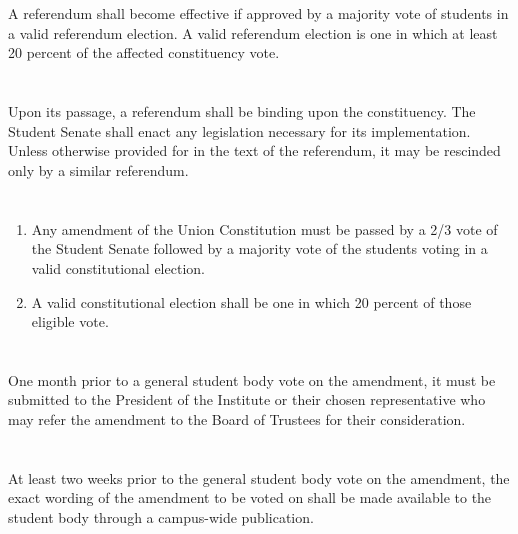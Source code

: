 \documentclass{uniondoc}
\begin{document}
\section{}

A referendum shall become effective if approved by a majority vote of students in a valid referendum election. A valid referendum election is one in which at least 20 percent of the affected constituency vote.

\section{}

Upon its passage, a referendum shall be binding upon the constituency. The Student Senate shall enact any legislation necessary for its implementation. Unless otherwise provided for in the text of the referendum, it may be rescinded only by a similar referendum.


\section{}

\begin{enumerate}
	\item Any amendment of the Union Constitution must be passed by a 2/3 vote of the Student Senate followed by a majority vote of the students voting in a valid constitutional election.
	\item A valid constitutional election shall be one in which 20 percent of those eligible vote.
\end{enumerate}

\section{}

One month prior to a general student body vote on the amendment, it must be submitted to the President of the Institute or their chosen representative who may refer the amendment to the Board of Trustees for their consideration.

\section{}

At least two weeks prior to the general student body vote on the amendment, the exact wording of the amendment to be voted on shall be made available to the student body through a campus-wide publication.
\end{document}

